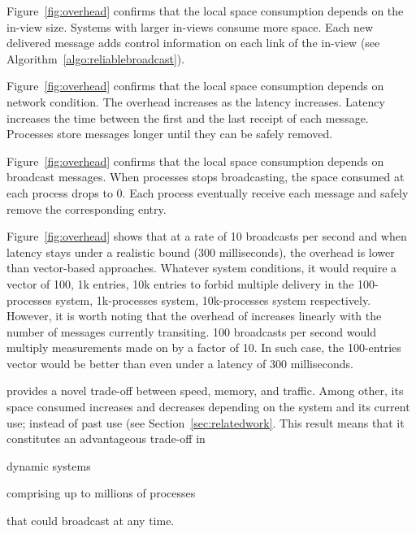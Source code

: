 \noindent Figure~\ref{fig:overhead} confirms that the local space consumption
  depends on the in-view size. Systems with larger in-views consume more
  space. Each new delivered message adds control information on each link of the
  in-view (see Algorithm~\ref{algo:reliablebroadcast}).

\noindent Figure~\ref{fig:overhead} confirms that the local space consumption
  depends on network condition. The overhead increases as the latency
  increases. Latency increases the time between the first and the last receipt
  of each message. Processes store messages longer until they can be safely
  removed. 

\noindent Figure~\ref{fig:overhead} confirms that the local space consumption
  depends on broadcast messages. When processes stops broadcasting, the space
  consumed at each process drops to 0. Each process eventually receive each
  message and safely remove the corresponding entry.

\noindent Figure~\ref{fig:overhead} shows that at a rate of 10 broadcasts per second
  and when latency stays under a realistic bound ($300$ milliseconds), the overhead is
  lower than vector-based approaches. Whatever system conditions, it would
  require a vector of 100, 1k entries, 10k entries to forbid multiple delivery
  in the 100-processes system, 1k-processes system, 10k-processes system
  respectively. However, it is worth noting that the overhead of \RPCBROADCAST
  increases linearly with the number of messages currently transiting. 100
  broadcasts per second would multiply measurements made on \RPCBROADCAST by a
  factor of 10. In such case, the 100-entries vector would be better than
  \RPCBROADCAST even under a latency of $300$ milliseconds. 

\noindent \RPCBROADCAST provides a novel trade-off between speed, memory, and
traffic. Among other, its space consumed increases and decreases depending on
the system and its current use; instead of past use (see
Section~\ref{sec:relatedwork}. This result means that it constitutes an
advantageous trade-off in
\begin{inparaenum}[(i)]
\item dynamic systems
\item comprising up to millions of processes
\item that could broadcast at any time.
\end{inparaenum} \\

